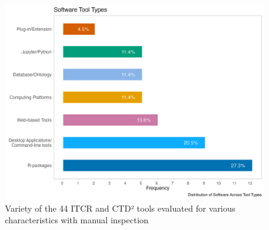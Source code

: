 \documentclass{article}
\begin{document}
\begin{figure}[ht] 
    \centering
\includegraphics[width=\textwidth,height=\textheight,keepaspectratio]{images/software_tool_types.png}
    \caption{Variety of the 44 ITCR and CTD² tools evaluated for various characteristics with manual inspection}
    \label{fig:tool_eval}
\end{figure}
\end{document}
